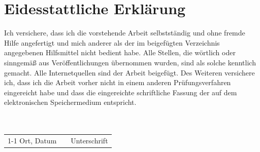 \newpage
\thispagestyle{empty}
\section*{Eidesstattliche Erklärung}
Ich versichere, dass ich die vorstehende Arbeit selbstständig und ohne fremde Hilfe angefertigt und mich anderer als der im beigefügten Verzeichnis angegebenen Hilfsmittel nicht bedient habe. Alle Stellen, die wörtlich oder sinngemäß aus Veröffentlichungen übernommen wurden, sind als solche kenntlich gemacht. Alle Internetquellen sind der Arbeit beigefügt. Des Weiteren versichere ich, dass ich die Arbeit vorher nicht in einem anderen Prüfungsverfahren eingereicht habe und dass die eingereichte schriftliche Fassung der auf dem elektronischen Speichermedium entspricht.
\\ \\ \\
\begin{tabular}{lp{3em}l}
	\hspace{5cm}   && \hspace{4cm} \\\cline{1-1}\cline{3-3}
	Ort, Datum     && Unterschrift
\end{tabular}

